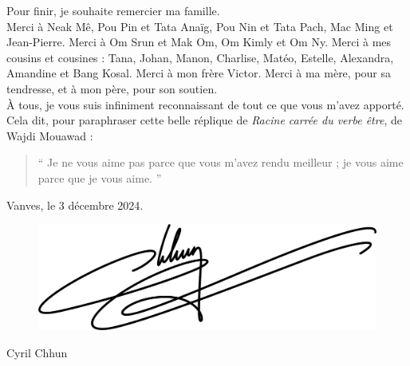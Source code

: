 \begin{otherlanguage}{french}
Pour finir, je souhaite remercier ma famille.\\

Merci à Neak Mê, Pou Pin et Tata Anaïg, Pou Nin et Tata Pach, Mac Ming et Jean-Pierre. Merci à Om Srun et Mak Om, Om Kimly et Om Ny. Merci à mes cousins et cousines : Tana, Johan, Manon, Charlise, Matéo, Estelle, Alexandra, Amandine et Bang Kosal. Merci à mon frère Victor. Merci à ma mère, pour sa tendresse, et à mon père, pour son soutien.\\

À tous, je vous suis infiniment reconnaissant de tout ce que vous m'avez apporté.\\

Cela dit, pour paraphraser cette belle réplique de \textit{Racine carrée du verbe être}, de Wajdi Mouawad :

\begin{quote}
   `` Je ne vous aime pas parce que vous m'avez rendu meilleur ; je vous aime parce que je vous aime. ''
\end{quote}

\raggedleft
Vanves, le 3 décembre 2024.

\vspace*{0.5cm}

\begin{figure}[h!]
    \raggedleft
    \includegraphics[width=0.3\linewidth]{preamble/signature.png}
    \label{fig:signature}
\end{figure}

Cyril Chhun

\end{otherlanguage}

